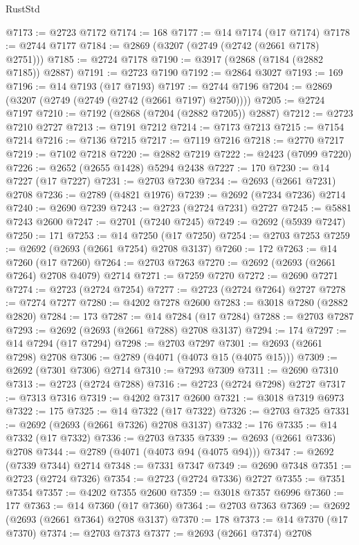 \begin{lexlean}{RustStd}
\begin{coremodule}
{\begin{coremodule}
{{{{{{{{{{{{{{{{{{{{{{{{{{{{{{{{{{{{{{{@7173 := @2723 @7172
@7174 := 168
@7177 := @14 @7174 (@17 @7174)
@7178 := @2744 @7177
@7184 := @2869 (@3207 (@2749 (@2742 (@2661 @7178) @2751)))
@7185 := @2724 @7178
@7190 := @3917 (@2868 (@7184 (@2882 @7185)) @2887)
@7191 := @2723 @7190
@7192 := @2864 @3027
@7193 := 169
@7196 := @14 @7193 (@17 @7193)
@7197 := @2744 @7196
@7204 := @2869 (@3207 (@2749 (@2749 (@2742 (@2661 @7197) @2750))))
@7205 := @2724 @7197
@7210 := @7192 (@2868 (@7204 (@2882 @7205)) @2887)
@7212 := @2723 @7210 @2727
@7213 := @7191 @7212
@7214 := @7173 @7213
@7215 := @7154 @7214
@7216 := @7136 @7215
@7217 := @7119 @7216
@7218 := @2770 @7217
@7219 := @7102 @7218
@7220 := @2882 @7219
@7222 := @2423 (@7099 @7220)
@7226 := @2652 (@2655 @1428) @5294 @2438
@7227 := 170
@7230 := @14 @7227 (@17 @7227)
@7231 := @2703 @7230
@7234 := @2693 (@2661 @7231) @2708
@7236 := @2789 (@4821 @1976)
@7239 := @2692 (@7234 @7236) @2714
@7240 := @2690 @7239
@7243 := @2723 (@2724 @7231) @2727
@7245 := @5881 @7243 @2600
@7247 := @2701 (@7240 @7245)
@7249 := @2692 (@5939 @7247)
@7250 := 171
@7253 := @14 @7250 (@17 @7250)
@7254 := @2703 @7253
@7259 := @2692 (@2693 (@2661 @7254) @2708 @3137)
@7260 := 172
@7263 := @14 @7260 (@17 @7260)
@7264 := @2703 @7263
@7270 := @2692 (@2693 (@2661 @7264) @2708 @4079) @2714
@7271 := @7259 @7270
@7272 := @2690 @7271
@7274 := @2723 (@2724 @7254)
@7277 := @2723 (@2724 @7264) @2727
@7278 := @7274 @7277
@7280 := @4202 @7278 @2600
@7283 := @3018 @7280 (@2882 @2820)
@7284 := 173
@7287 := @14 @7284 (@17 @7284)
@7288 := @2703 @7287
@7293 := @2692 (@2693 (@2661 @7288) @2708 @3137)
@7294 := 174
@7297 := @14 @7294 (@17 @7294)
@7298 := @2703 @7297
@7301 := @2693 (@2661 @7298) @2708
@7306 := @2789 (@4071 (@4073 @15 (@4075 @15)))
@7309 := @2692 (@7301 @7306) @2714
@7310 := @7293 @7309
@7311 := @2690 @7310
@7313 := @2723 (@2724 @7288)
@7316 := @2723 (@2724 @7298) @2727
@7317 := @7313 @7316
@7319 := @4202 @7317 @2600
@7321 := @3018 @7319 @6973
@7322 := 175
@7325 := @14 @7322 (@17 @7322)
@7326 := @2703 @7325
@7331 := @2692 (@2693 (@2661 @7326) @2708 @3137)
@7332 := 176
@7335 := @14 @7332 (@17 @7332)
@7336 := @2703 @7335
@7339 := @2693 (@2661 @7336) @2708
@7344 := @2789 (@4071 (@4073 @94 (@4075 @94)))
@7347 := @2692 (@7339 @7344) @2714
@7348 := @7331 @7347
@7349 := @2690 @7348
@7351 := @2723 (@2724 @7326)
@7354 := @2723 (@2724 @7336) @2727
@7355 := @7351 @7354
@7357 := @4202 @7355 @2600
@7359 := @3018 @7357 @6996
@7360 := 177
@7363 := @14 @7360 (@17 @7360)
@7364 := @2703 @7363
@7369 := @2692 (@2693 (@2661 @7364) @2708 @3137)
@7370 := 178
@7373 := @14 @7370 (@17 @7370)
@7374 := @2703 @7373
@7377 := @2693 (@2661 @7374) @2708
}}}}}}}}}}}}}}}}}}}}}}}}}}}}}}}}}}}}}}}
\end{coremodule}}
\end{coremodule}
\end{lexlean}
